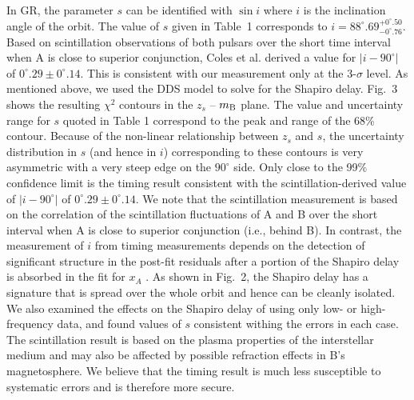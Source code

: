 \documentclass[12pt,psfig]{article}
\begin{document}
In GR, the parameter $s$ can be identified with $\sin i$ where $i$ is the
inclination angle of the orbit. The value of $s$ given in Table~1 corresponds
to $i= 88^\circ.69^{+0^\circ.50}_{-0^\circ.76}$.  Based on scintillation
observations of both pulsars over the short time interval when A is close to
superior conjunction, Coles et al.\cite{cmr+05} derived a value for
$|i-90^\circ|$ of $0^\circ.29 \pm 0^\circ.14$. This is consistent with our
measurement only at the 3-$\sigma$ level. As mentioned above, we used the DDS
model to solve for the Shapiro delay. Fig.~3 shows the resulting $\chi^2$
contours in the $z_s$ -- $m_{\rm B}$ plane. The value and uncertainty range
for $s$ quoted in Table 1 correspond to the peak and range of the 68\%
contour.  Because of the non-linear relationship between $z_s$ and $s$, the
uncertainty distribution in $s$ (and hence in $i$) corresponding to these
contours is very asymmetric with a very steep edge on the $90^\circ$ side.
Only close to the 99\% confidence limit is the timing result consistent with
the scintillation-derived value of $|i-90^\circ|$ of $0^\circ.29 \pm
0^\circ.14$\cite{cmr+05}. We note that the scintillation measurement is based
on the correlation of the scintillation fluctuations of A and B over the short
interval when A is close to superior conjunction (i.e., behind B).  In
contrast, the measurement of $i$ from timing measurements depends on the
detection of significant structure in the post-fit residuals after a portion
of the Shapiro delay is absorbed in the fit for $x_A$ \cite{lcw+01}. 
As shown in Fig.~2,
the Shapiro delay has a signature that is spread over the
whole orbit and hence can be cleanly isolated. 
We also examined the effects
on the Shapiro delay of using only low- or high-frequency data, and found
values of $s$ consistent withing the errors in each case.
The scintillation result is
based on the plasma properties of the interstellar medium and may also be
affected by possible refraction effects in B's magnetosphere. We believe that
the timing result is much less susceptible to systematic errors and is
therefore more secure.
\end{document}

